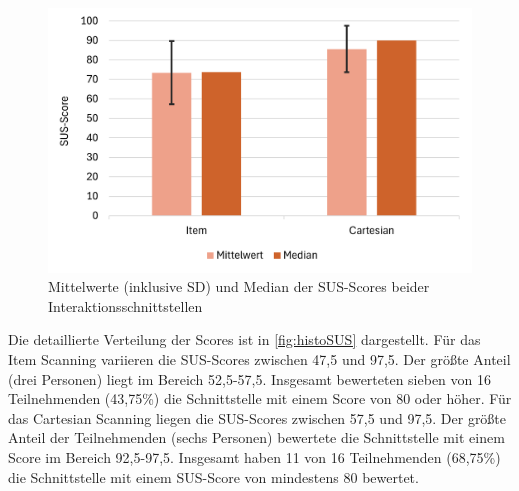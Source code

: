 \begin{figure}[tbh]
    \centering
    \includegraphics[scale=0.75]{images/Results/SUS-Scores.png}
    \caption{Mittelwerte (inklusive SD) und Median der SUS-Scores beider Interaktionsschnittstellen}
    \label{fig:resultsSUS}
\end{figure}

Die detaillierte Verteilung der Scores ist in \autoref{fig:histoSUS} dargestellt. Für das Item Scanning variieren die SUS-Scores zwischen 47,5 und 97,5. Der größte Anteil (drei Personen) liegt im Bereich 52,5-57,5. Insgesamt bewerteten sieben von 16 Teilnehmenden (43,75\%) die Schnittstelle mit einem Score von 80 oder höher. Für das Cartesian Scanning liegen die SUS-Scores zwischen 57,5 und 97,5. Der größte Anteil der Teilnehmenden (sechs Personen) bewertete die Schnittstelle mit einem Score im Bereich 92,5-97,5. Insgesamt haben 11 von 16 Teilnehmenden (68,75\%) die Schnittstelle mit einem SUS-Score von mindestens 80 bewertet. 

